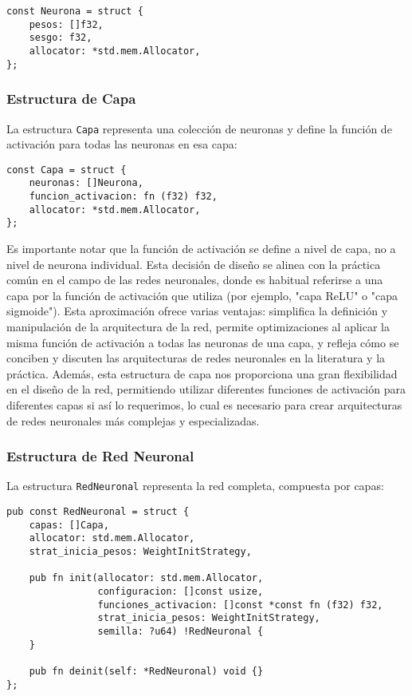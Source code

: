 \documentclass[twocolumn]{article}
\begin{document}
\begin{lstlisting}[style=customcode]
const Neurona = struct {
    pesos: []f32,
    sesgo: f32,
    allocator: *std.mem.Allocator,
};
\end{lstlisting}

\subsubsection{Estructura de Capa}
La estructura \texttt{Capa} representa una colección de neuronas y define la función de activación para todas las neuronas en esa capa:

\begin{lstlisting}[style=customcode]
const Capa = struct {
    neuronas: []Neurona,
    funcion_activacion: fn (f32) f32,
    allocator: *std.mem.Allocator,
};
\end{lstlisting}

Es importante notar que la función de activación se define a nivel de capa, no a nivel de neurona individual. Esta decisión de diseño se alinea con la práctica común en el campo de las redes neuronales, donde es habitual referirse a una capa por la función de activación que utiliza (por ejemplo, "capa ReLU" o "capa sigmoide"). Esta aproximación ofrece varias ventajas: simplifica la definición y manipulación de la arquitectura de la red, permite optimizaciones al aplicar la misma función de activación a todas las neuronas de una capa, y refleja cómo se conciben y discuten las arquitecturas de redes neuronales en la literatura y la práctica. Además, esta estructura de capa nos proporciona una gran flexibilidad en el diseño de la red, permitiendo utilizar diferentes funciones de activación para diferentes capas si así lo requerimos, lo cual es necesario para crear arquitecturas de redes neuronales más complejas y especializadas.


\subsubsection{Estructura de Red Neuronal}
La estructura \texttt{RedNeuronal} representa la red completa, compuesta por capas:

\begin{lstlisting}[style=customcode]
pub const RedNeuronal = struct {
    capas: []Capa,
    allocator: std.mem.Allocator,
    strat_inicia_pesos: WeightInitStrategy,

    pub fn init(allocator: std.mem.Allocator,
                configuracion: []const usize,
                funciones_activacion: []const *const fn (f32) f32,
                strat_inicia_pesos: WeightInitStrategy,
                semilla: ?u64) !RedNeuronal {
    }

    pub fn deinit(self: *RedNeuronal) void {}
};
\end{lstlisting}
\end{document}
